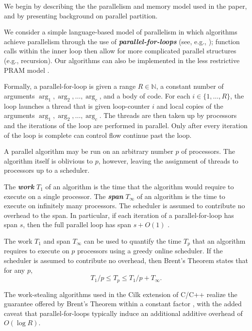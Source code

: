 \documentclass[sigplan, 10pt, nonacm]{acmart}
\newcommand{\defn}[1]{{\textit{\textbf{\boldmath #1}}}}
\renewcommand{\paragraph}[1]{\vspace{0.09in}\noindent{\bf \boldmath #1.}}
\theoremstyle{remark}
\theoremstyle{remark}
\begin{document}
We begin by describing the the parallelism and memory model used in
the paper, and by presenting background on parallel partition.

\paragraph{Workflow Model} We consider a simple language-based model of parallelism in which algorithms achieve parallelism through the use of \defn{parallel-for-loops} (see, e.g.,
\cite{Blelloch96,AcarBl16,CLRS}); function calls within the inner loop
then allow for more complicated parallel structures (e.g., recursion). Our algorithms can also be implemented in the less restrictive PRAM model \cite{Blelloch96, AcarBl16}.

Formally, a parallel-for-loop is given a range $R \in \mathbb{N}$, a
constant number of arguments $\arg_1, \arg_2, \ldots, \arg_c$, and a
body of code. For each $i \in \{1, \ldots, R\}$, the loop launches a
thread that is given loop-counter $i$ and local copies of the
arguments $\arg_1, \arg_2, \ldots, \arg_c$. The threads are then taken up by processors and the iterations of the loop are performed in parallel. Only after every iteration of the loop is complete can control flow continue past the loop.

A parallel algorithm may be run on an arbitrary number $p$ of
processors. The algorithm itself is oblivious to $p$, however, leaving
the assignment of threads to processors up to a scheduler.

The \defn{work} $T_1$ of an algorithm is the time that the algorithm
would require to execute on a single processor. The \defn{span}
$T_\infty$ of an algorithm is the time to execute on infinitely many
processors. The scheduler is assumed to contribute no overhead to the
span. In particular, if each iteration of a
parallel-for-loop has span $s$, then the full parallel loop has span
$s + O(1)$ \cite{Blelloch96,AcarBl16}.

The work $T_1$ and span $T_\infty$ can be used to quantify the time $T_p$
that an algorithm requires to execute on $p$ processors using a greedy
online scheduler. If the scheduler is assumed to contribute no
overhead, then Brent's Theorem \cite{Brent74} states that for any
$p$,
$$T_1 / p \le T_p \le T_1 / p + T_\infty.$$

The work-stealing algorithms used in the Cilk extension of C/C++ realize
the guarantee offered by Brent's Theorem within a constant factor
\cite{BlumofeJo96,BlumofeLe99}, with the added caveat that parallel-for-loops typically induce an additional additive overhead of $O(\log
R)$. 
\end{document}
